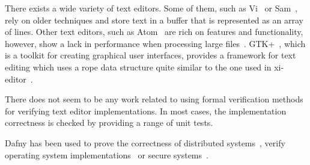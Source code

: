 There exists a wide variety of text editors.
Some of them, such as Vi~\cite{vi} or Sam~\cite{pike1987text}, rely on older techniques and store text in a buffer that is represented as an array of lines.
Other text editors, such as Atom~\cite{atom} are rich on features and functionality, however, show a lack in performance when processing large files~\cite{atom-perf}.
GTK+~\cite{gtk}, which is a toolkit for creating graphical user interfaces, provides a framework for text editing which uses a rope data structure quite similar to the one used in xi-editor~\cite{gtk-rope}.

There does not seem to be any work related to using formal verification methods for verifying text editor implementations.
In most cases, the implementation correctness is checked by providing a range of unit tests.

Dafny has been used to prove the correctness of distributed systems~\cite{hawblitzel2015ironfleet}, verify operating system implementations~\cite{mai2013verifying} or secure systems~\cite{hawblitzel2014ironclad}.
